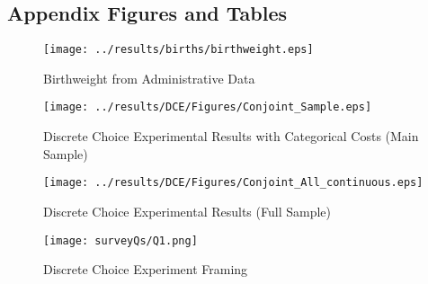 \documentclass[a4paper, 11pt]{article}
\begin{document}
\begin{spacing}{1.4}
\appendix
\section{Appendix Figures and Tables}
\begin{figure}[htpb!]
  \begin{center}
    \caption{Birthweight from Administrative Data}
    \label{bwt-nvss}
  \texttt{[image: ../results/births/birthweight.eps]}
  \end{center}
\end{figure}


\begin{figure}[htpb!]
  \begin{center}
    \caption{Discrete Choice Experimental Results with Categorical Costs (Main Sample)}
    \label{DCE-full-samp}
  \texttt{[image: ../results/DCE/Figures/Conjoint\_Sample.eps]}
  \end{center}
\end{figure}

\begin{figure}[htpb!]
  \begin{center}
    \caption{Discrete Choice Experimental Results (Full Sample)}
    \label{DCE-samp}
  \texttt{[image: ../results/DCE/Figures/Conjoint\_All\_continuous.eps]}
  \end{center}
\end{figure}








\begin{figure}[htpb!]
  \begin{center}
    \caption{Discrete Choice Experiment Framing}
    \label{DCE-frame}
  \texttt{[image: surveyQs/Q1.png]}
  \end{center}
\end{figure}


\end{spacing}
\end{document}
